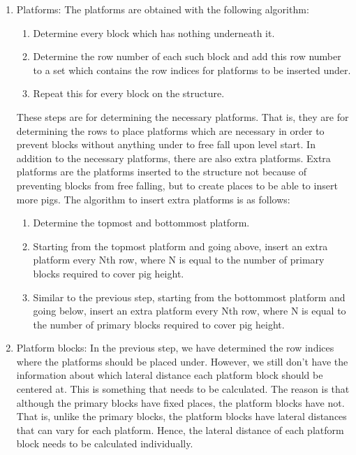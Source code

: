 \documentclass[12pt]{dalthesis}
\begin{document}
\begin{enumerate}
\begin{enumerate}
    \item Platforms: The platforms are obtained with the following algorithm:

    \begin{enumerate}
      \item Determine every block which has nothing underneath it.
      \item Determine the row number of each such block and add this row number to a set which contains the row indices for platforms to be inserted under.
      \item Repeat this for every block on the structure.
    \end{enumerate}

    These steps are for determining the necessary platforms. That is, they are for determining the rows to place platforms which are necessary in order to prevent blocks without anything under to free fall upon level start. In addition to the necessary platforms, there are also extra platforms. Extra platforms are the platforms inserted to the structure not because of preventing blocks from free falling, but to create places to be able to insert more pigs. The algorithm to insert extra platforms is as follows:

    \begin{enumerate}
      \item Determine the topmost and bottommost platform.
      \item Starting from the topmost platform and going above, insert an extra platform every Nth row, where N is equal to the number of primary blocks required to cover pig height.
      \item Similar to the previous step, starting from the bottommost platform and going below, insert an extra platform every Nth row, where N is equal to the number of primary blocks required to cover pig height.
    \end{enumerate}

    \item Platform blocks: In the previous step, we have determined the row indices where the platforms should be placed under. However, we still don't have the information about which lateral distance each platform block should be centered at. This is something that needs to be calculated. The reason is that although the primary blocks have fixed places, the platform blocks have not. That is, unlike the primary blocks, the platform blocks have lateral distances that can vary for each platform. Hence, the lateral distance of each platform block needs to be calculated individually.


\end{enumerate}
\end{enumerate}
\end{document}
